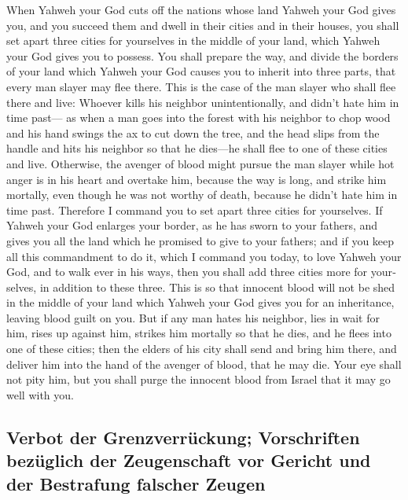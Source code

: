 \begin{paracol}{2}
\begin{otherlanguage}{english}
 When Yahweh your God cuts off the nations whose land
Yahweh your God gives you, and you succeed them and dwell in their
cities and in their houses,  you shall set apart three
cities for yourselves in the middle of your land, which Yahweh your God
gives you to possess.  You shall prepare the way, and
divide the borders of your land which Yahweh your God causes you to
inherit into three parts, that every man slayer may flee there.
 This is the case of the man slayer who shall flee there
and live: Whoever kills his neighbor unintentionally, and didn't hate
him in time past---  as when a man goes into the forest
with his neighbor to chop wood and his hand swings the ax to cut down
the tree, and the head slips from the handle and hits his neighbor so
that he dies---he shall flee to one of these cities and live.
 Otherwise, the avenger of blood might pursue the man
slayer while hot anger is in his heart and overtake him, because the way
is long, and strike him mortally, even though he was not worthy of
death, because he didn't hate him in time past.  Therefore
I command you to set apart three cities for yourselves. 
If Yahweh your God enlarges your border, as he has sworn to your
fathers, and gives you all the land which he promised to give to your
fathers;  and if you keep all this commandment to do it,
which I command you today, to love Yahweh your God, and to walk ever in
his ways, then you shall add three cities more for yourselves, in
addition to these three.  This is so that innocent blood
will not be shed in the middle of your land which Yahweh your God gives
you for an inheritance, leaving blood guilt on you.  But
if any man hates his neighbor, lies in wait for him, rises up against
him, strikes him mortally so that he dies, and he flees into one of
these cities;  then the elders of his city shall send and
bring him there, and deliver him into the hand of the avenger of blood,
that he may die.  Your eye shall not pity him, but you
shall purge the innocent blood from Israel that it may go well with you.

\hypertarget{verbot-der-grenzverruxfcckung-vorschriften-bezuxfcglich-der-zeugenschaft-vor-gericht-und-der-bestrafung-falscher-zeugen-1}{%
\subsection{Verbot der Grenzverrückung; Vorschriften bezüglich der
Zeugenschaft vor Gericht und der Bestrafung falscher
Zeugen}\label{verbot-der-grenzverruxfcckung-vorschriften-bezuxfcglich-der-zeugenschaft-vor-gericht-und-der-bestrafung-falscher-zeugen-1}}


\end{otherlanguage}
\end{paracol}
